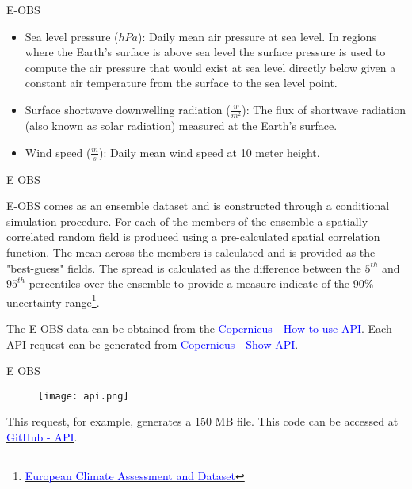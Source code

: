 \documentclass[xcolor={dvipsnames}]{beamer}
\begin{document}
\begin{frame}{E-OBS}

\begin{itemize}
    \item Sea level pressure ($hPa$): Daily mean air pressure at sea level. In regions where the Earth's surface is above sea level the surface pressure is used to compute the air pressure that would exist at sea level directly below given a constant air temperature from the surface to the sea level point.
    \item Surface shortwave downwelling radiation ($\frac{w}{m^2}$): The flux of shortwave radiation (also known as solar radiation) measured at the Earth's surface.
    \item Wind speed ($\frac{m}{s}$): Daily mean wind speed at 10 meter height.
\end{itemize}
    
\end{frame}

\begin{frame}{E-OBS}

E-OBS comes as an ensemble dataset and is constructed through a conditional simulation procedure. For each of the members of the ensemble a spatially correlated random field is produced using a pre-calculated spatial correlation function. The mean across the members is calculated and is provided as the "best-guess" fields. The spread is calculated as the difference between the $5^{th}$ and $95^{th}$ percentiles over the ensemble to provide a measure indicate of the 90\% uncertainty range\footnote{\href{https://www.ecad.eu/download/ensembles/download.php}{\textcolor{blue}{European Climate Assessment and Dataset}}}.

\hfill

The E-OBS data can be obtained from the \href{https://cds.climate.copernicus.eu/api-how-to}{\textcolor{blue}{Copernicus - How to use API}}. Each API request can be generated from \href{https://cds.climate.copernicus.eu/cdsapp#!/dataset/insitu-gridded-observations-europe?tab=form}{\textcolor{blue}{Copernicus - Show API}}.

\end{frame}

\begin{frame}{E-OBS}

\begin{figure}[H]
  \raggedright
  \texttt{[image: api.png]}\\
  \label{fig:api}
\end{figure}

This request, for example, generates a 150 MB file. This code can be accessed at \href{https://github.com/AlexFidalgo/BergenProject/blob/main/Bergen_Metrics/api.py}{\textcolor{blue}{GitHub - API}}.
    
\end{frame}
\end{document}
